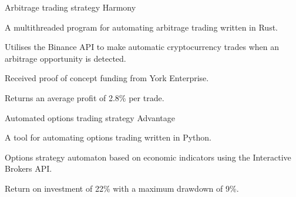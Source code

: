 
\begin{cventries}
  \cventry
    {Arbitrage trading strategy} %
    {Harmony} %
    {} %
    {} %
    {
      \begin{cvitems} %
        \item {A multithreaded program for automating arbitrage trading written in Rust.}
        \vspace{0.5mm}
		\item {Utilises the Binance API to make automatic cryptocurrency trades when an arbitrage opportunity is detected.}
		\vspace{0.5mm}
		\item {Received proof of concept funding from York Enterprise.}
		\vspace{0.5mm}
		\item {Returns an average profit of 2.8\% per trade.}
      \end{cvitems}
    }

  \cventry
    {Automated options trading strategy} %
    {Advantage} %
    {} %
    {} %
    {
      \begin{cvitems} %
        \item {A tool for automating options trading written in Python.}
        \vspace{0.5mm}
		\item {Options strategy automaton based on economic indicators using the Interactive Brokers API.}
		\vspace{0.5mm}
		\item {Return on investment of 22\% with a maximum drawdown of 9\%.}
      \end{cvitems}
    }
\end{cventries}